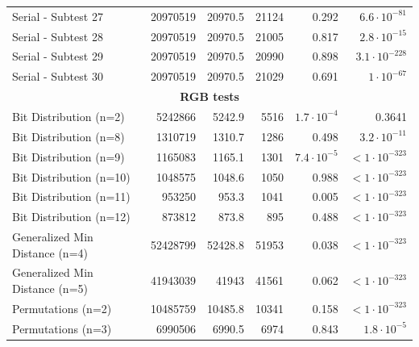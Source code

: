 \documentclass[
	digital,    %
	oneside,    %
	color,
	11pt,
	nocover,
	notable,
	nolof,
	nolot,
]{fithesis3}
\newcommand{\rd}{\cellcolor{red!40}}
\theoremstyle{definition}
\theoremstyle{remark}
\begin{document}
\begin{table}[H]
\begin{nomar}
{\begin{tabular}{@{}lrrrrr@{}}
Serial - Subtest 27            & 20970519          & 20970.5       & 21124         & 0.292                  & $6.6 \cdot 10^{-81}$  \rd \\
Serial - Subtest 28            & 20970519          & 20970.5       & 21005         & 0.817                  & $2.8 \cdot 10^{-15}$  \rd \\
Serial - Subtest 29            & 20970519          & 20970.5       & 20990         & 0.898                  & $3.1 \cdot 10^{-228}$ \rd \\
Serial - Subtest 30            & 20970519          & 20970.5       & 21029         & 0.691                  & $1 \cdot 10^{-67}$    \rd \\ \midrule
\multicolumn{6}{c}{\textbf{RGB tests}} \\ \midrule
Bit Distribution (n=2)         & 5242866           & 5242.9        & 5516          & $1.7\cdot 10^{-4}$ \rd & 0.3641                \\
Bit Distribution (n=8)         & 1310719           & 1310.7        & 1286          & 0.498                  & $3.2 \cdot 10^{-11}$  \rd \\
Bit Distribution (n=9)         & 1165083           & 1165.1        & 1301          & $7.4\cdot 10^{-5}$ \rd & $<1\cdot 10^{-323}$   \rd \\
Bit Distribution (n=10)        & 1048575           & 1048.6        & 1050          & 0.988                  & $<1\cdot 10^{-323}$   \rd \\
Bit Distribution (n=11)        & 953250            & 953.3         & 1041          & 0.005                  & $<1\cdot 10^{-323}$   \rd \\
Bit Distribution (n=12)        & 873812            & 873.8         & 895           & 0.488                  & $<1\cdot 10^{-323}$   \rd \\
Generalized Min Distance (n=4) & 52428799          & 52428.8       & 51953         & 0.038                  & $<1\cdot 10^{-323}$   \rd \\
Generalized Min Distance (n=5) & 41943039          & 41943         & 41561         & 0.062                  & $<1\cdot 10^{-323}$   \rd \\
Permutations (n=2)             & 10485759          & 10485.8       & 10341         & 0.158                  & $<1\cdot 10^{-323}$   \rd \\
Permutations (n=3)             & 6990506           & 6990.5        & 6974          & 0.843                  & $1.8 \cdot 10^{-5}$   \rd \\

\end{tabular}}
\end{nomar}
\end{table}
\end{document}
